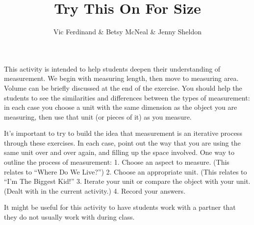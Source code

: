 \documentclass[handout]{ximera}
\title{Try This On For Size}
\author{Vic Ferdinand \& Betsy McNeal \& Jenny Sheldon}
\begin{document}
\begin{abstract}
\end{abstract}
\maketitle

\begin{instructorIntro}
This activity is intended to help students deepen their understanding of measurement.  We begin with measuring length, then move to measuring area.  Volume can be briefly discussed at the end of the exercise.  You should help the students to see the similarities and differences between the types of measurement: in each case you choose a unit with the same dimension as the object you are measuring, then use that unit (or pieces of it) as you measure.  

It's important to try to build the idea that measurement is an iterative process through these exercises. In each case, point out the way that you are using the same unit over and over again, and filling up the space involved.  One way to outline the process of measurement: 1.  Choose an aspect to measure. (This relates to ``Where Do We Live?'')  2. Choose an appropriate unit.  (This relates to ``I'm The Biggest Kid!''   3.  Iterate your unit or compare the object with your unit.  (Dealt with in the current activity.)  4.  Record your answers.

It might be useful for this activity to have students work with a partner that they do not usually work with during class.


\end{instructorIntro}
\end{document}
